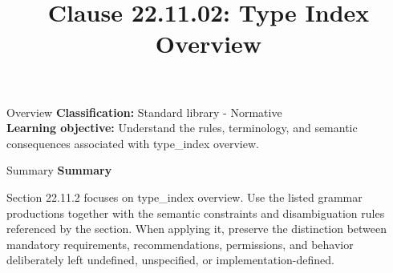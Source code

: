 \documentclass[10pt,letterpaper]{article}
\title{Clause 22.11.02: Type Index Overview}
\author{}
\date{}
\begin{document}
\maketitle
\begin{CornellOverviewBox}{Overview}
\textbf{Classification:} Standard library - Normative\\[2pt]
\textbf{Learning objective:} Understand the rules, terminology, and semantic consequences associated with type\_index overview.
\end{CornellOverviewBox}\begin{CornellSummaryBox}{Summary}
{\sffamily\bfseries\color{Accent} Summary}\par\vspace{3pt}Section 22.11.2 focuses on type\_index overview. Use the listed grammar productions together with the semantic constraints and disambiguation rules referenced by the section. When applying it, preserve the distinction between mandatory requirements, recommendations, permissions, and behavior deliberately left undefined, unspecified, or implementation-defined.
\end{CornellSummaryBox}
\end{document}
